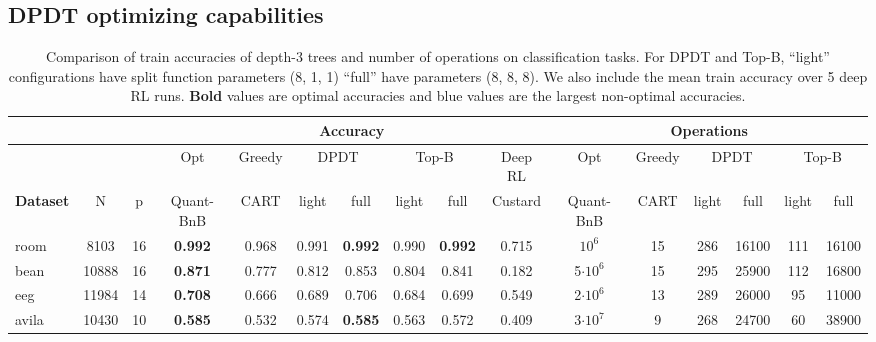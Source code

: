 \subsection{DPDT optimizing capabilities}
\begin{table}[ht]
    \centering
    \small
        \caption{Comparison of train accuracies of depth-3 trees and number of operations on classification tasks. For DPDT and Top-B, ``light'' configurations have split function parameters (8, 1, 1) ``full'' have parameters (8, 8, 8). We also include the mean train accuracy over 5 deep RL runs. \textbf{Bold} values are optimal accuracies and {\color{blue} blue} values are the largest non-optimal accuracies.}
    \label{tab:tree_comparison_combined}
    \begin{tabular}{l|cc||cc|cc|cc|c||cc|cc|cc}
    \toprule
    & & & \multicolumn{7}{c||}{\textbf{Accuracy}} & \multicolumn{6}{c}{\textbf{Operations}}\\
    \midrule
    & & & Opt & Greedy & \multicolumn{2}{c|}{DPDT} & \multicolumn{2}{c|}{Top-B} & \multicolumn{1}{c||}{Deep RL} & Opt & Greedy & \multicolumn{2}{c|}{DPDT} & \multicolumn{2}{c}{Top-B}\\
    \textbf{Dataset} & N & p & Quant-BnB & CART & light & full & light & full & Custard & Quant-BnB & CART & light & full & light & full \\
    \midrule
    room & 8103 & 16 & \textbf{0.992} & 0.968 & \color{blue} 0.991 & \textbf{0.992} & 0.990 & \textbf{0.992} & 0.715 &$10^6$ & 15 & 286 & 16100 & 111 & 16100 \\
    bean & 10888 & 16  & \textbf{0.871} & 0.777 & 0.812 & \color{blue} 0.853 & 0.804 & 0.841 & 0.182 & 5$\cdot 10^6$ & 15 & 295 & 25900 & 112 & 16800 \\
    eeg & 11984 & 14  & \textbf{0.708} & 0.666 & 0.689 & \color{blue} 0.706 & 0.684 & 0.699 & 0.549 & 2$\cdot 10^6$ & 13 & 289 & 26000 & 95 & 11000 \\
    avila & 10430 & 10  & \textbf{0.585} & 0.532 & \color{blue}0.574 & \textbf{0.585} & 0.563 & 0.572 & 0.409 & 3$\cdot 10^7$ & 9 & 268 & 24700 & 60 & 38900 \\

\end{tabular}
\end{table}
